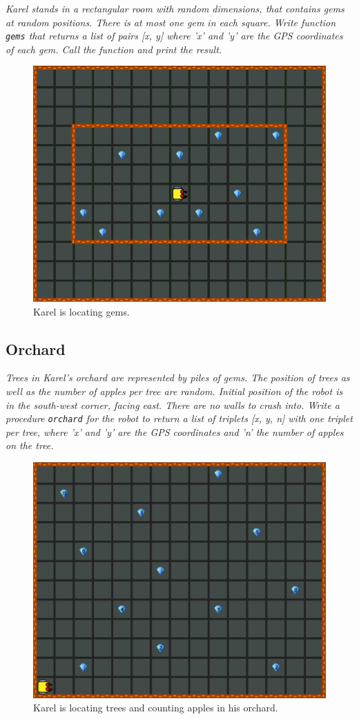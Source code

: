 {{{\em Karel stands in a rectangular room with random dimensions, that contains gems at random positions. There is at most one gem in each square. Write function {\tt gems}  that returns a list of pairs [x, y] where 'x' and 'y' are the GPS coordinates of each gem. Call the function and print the result.}

\begin{figure}[!ht]
\begin{center}
\includegraphics[height=0.4\textwidth]{img/h02b.png}
\end{center}
\vspace{-4mm}
\caption{Karel is locating gems.}
\label{fig:h02b}
\end{figure}



\subsection{Orchard}

{\em Trees in Karel's orchard are represented by piles of gems. The position of trees as well as the number of apples per tree are random. Initial position of the robot is in the south-west corner, facing east. There are no walls to crash into. Write a procedure {\tt orchard} for the robot to return a list of triplets [x, y, n] with one triplet per tree, where 'x' and 'y' are the GPS coordinates and 'n' the number of apples on the tree.}

\newpage

\begin{figure}[!ht]
\begin{center}
\includegraphics[height=0.4\textwidth]{img/h03.png}
\end{center}
\vspace{-4mm}
\caption{Karel is locating trees and counting apples in his orchard.}
\label{fig:h03}
\end{figure}


}}
